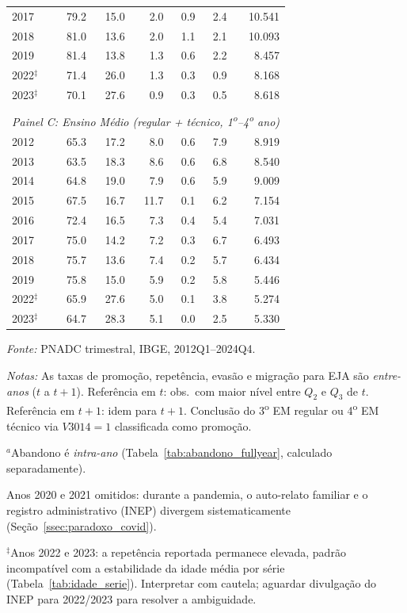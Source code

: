 \begin{table}[htbp]
\begin{threeparttable}
\begin{tabular}{lrrrrrr}
2017 & 79.2 & 15.0 & 2.0 & 0.9 & 2.4 & 10.541 \\
2018 & 81.0 & 13.6 & 2.0 & 1.1 & 2.1 & 10.093 \\
2019 & 81.4 & 13.8 & 1.3 & 0.6 & 2.2 & 8.457 \\
2022$^{\ddagger}$ & 71.4 & 26.0 & 1.3 & 0.3 & 0.9 & 8.168 \\
2023$^{\ddagger}$ & 70.1 & 27.6 & 0.9 & 0.3 & 0.5 & 8.618 \\
\\[0.3em]
\multicolumn{7}{l}{\textit{Painel C: Ensino M\'edio (regular + t\'ecnico, 1\textsuperscript{o}--4\textsuperscript{o} ano)}} \\
\midrule
2012 & 65.3 & 17.2 & 8.0 & 0.6 & 7.9 & 8.919 \\
2013 & 63.5 & 18.3 & 8.6 & 0.6 & 6.8 & 8.540 \\
2014 & 64.8 & 19.0 & 7.9 & 0.6 & 5.9 & 9.009 \\
2015 & 67.5 & 16.7 & 11.7 & 0.1 & 6.2 & 7.154 \\
2016 & 72.4 & 16.5 & 7.3 & 0.4 & 5.4 & 7.031 \\
2017 & 75.0 & 14.2 & 7.2 & 0.3 & 6.7 & 6.493 \\
2018 & 75.7 & 13.6 & 7.4 & 0.2 & 5.7 & 6.434 \\
2019 & 75.8 & 15.0 & 5.9 & 0.2 & 5.8 & 5.446 \\
2022$^{\ddagger}$ & 65.9 & 27.6 & 5.0 & 0.1 & 3.8 & 5.274 \\
2023$^{\ddagger}$ & 64.7 & 28.3 & 5.1 & 0.0 & 2.5 & 5.330 \\
\bottomrule
\end{tabular}
\begin{tablenotes}\footnotesize
\item \textit{Fonte:} PNADC trimestral, IBGE, 2012Q1--2024Q4.
\item \textit{Notas:} As taxas de promo\c{c}\~ao, repet\^encia, evas\~ao e migra\c{c}\~ao para EJA s\~ao \emph{entre-anos} ($t$ a $t+1$). Refer\^encia em $t$: obs.\ com maior n\'ivel entre $Q_2$ e $Q_3$ de $t$. Refer\^encia em $t+1$: idem para $t+1$. Conclus\~ao do 3\textsuperscript{o} EM regular ou 4\textsuperscript{o} EM t\'ecnico via $V3014=1$ classificada como promo\c{c}\~ao.
\item $^{a}$Abandono \'e \emph{intra-ano} (Tabela~\ref{tab:abandono_fullyear}, calculado separadamente).
\item Anos 2020 e 2021 omitidos: durante a pandemia, o auto-relato familiar e o registro administrativo (INEP) divergem sistematicamente (Se\c{c}\~ao~\ref{ssec:paradoxo_covid}).
\item $^{\ddagger}$Anos 2022 e 2023: a repet\^encia reportada permanece elevada, padr\~ao incompat\'ivel com a estabilidade da idade m\'edia por s\'erie (Tabela~\ref{tab:idade_serie}). Interpretar com cautela; aguardar divulga\c{c}\~ao do INEP para 2022/2023 para resolver a ambiguidade.
\end{tablenotes}
\end{threeparttable}
\end{table}
